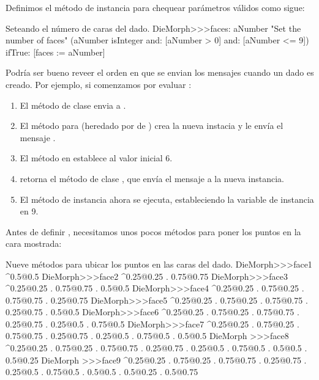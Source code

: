 \documentclass[a4paper,10pt,twoside]{book}
\begin{document}
Definimos el m\'etodo de instancia  para chequear par\'ametros v\'alidos como sigue:

\begin{method}{Seteando el n\'umero de caras del dado.}
DieMorph>>>faces: aNumber
	"Set the number of faces"
	(aNumber isInteger
			and: [aNumber > 0]
			and: [aNumber <= 9])
		ifTrue: [faces := aNumber]
\end{method}

Podr\'ia ser bueno reveer el orden en que se envian los mensajes cuando un dado es creado. Por ejemplo, si comenzamos por
evaluar :
\begin{enumerate}
	\item El m\'etodo de clase  envia  a .
	\item El m\'etodo para  (heredado por  de ) crea la nueva instacia y le env\'ia el mensaje .
	\item El m\'etodo   en  establece  al valor inicial 6.
	\item {} retorna el m\'etodo de clase , que env\'ia el mensaje  a la nueva instancia.
	\item El m\'etodo de instancia  ahora se ejecuta, estableciendo la variable de instancia  en 9.
\end{enumerate}

Antes de definir , necesitamos unos pocos m\'etodos para poner los puntos en la cara mostrada:
\begin{methods}{Nueve m\'etodos para ubicar los puntos en las caras del dado.}
DieMorph>>>face1
	^{0.5@0.5}
DieMorph>>>face2
	^{0.25@0.25 . 0.75@0.75}
DieMorph>>>face3
	^{0.25@0.25 . 0.75@0.75 . 0.5@0.5}
DieMorph>>>face4
	^{0.25@0.25 . 0.75@0.25 . 0.75@0.75 . 0.25@0.75}
DieMorph>>>face5
	^{0.25@0.25 . 0.75@0.25 . 0.75@0.75 . 0.25@0.75 . 0.5@0.5}
DieMorph>>>face6
	^{0.25@0.25 . 0.75@0.25 . 0.75@0.75 . 0.25@0.75 . 0.25@0.5 . 0.75@0.5}
DieMorph>>>face7
	^{0.25@0.25 . 0.75@0.25 . 0.75@0.75 . 0.25@0.75 . 0.25@0.5 . 0.75@0.5 . 0.5@0.5}
DieMorph >>>face8
	^{0.25@0.25 . 0.75@0.25 . 0.75@0.75 . 0.25@0.75 . 0.25@0.5 . 0.75@0.5 . 0.5@0.5 . 0.5@0.25}
DieMorph >>>face9
	^{0.25@0.25 . 0.75@0.25 . 0.75@0.75 . 0.25@0.75 . 0.25@0.5 . 0.75@0.5 . 0.5@0.5 . 0.5@0.25 . 0.5@0.75}
\end{methods}
\end{document}

